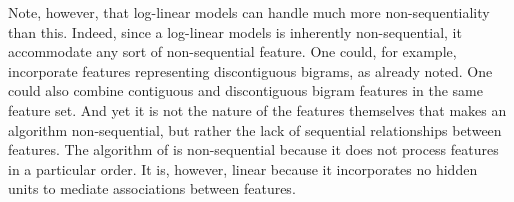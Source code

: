 Note, however, that log-linear models can handle much more non-sequentiality than this. Indeed, since a log-linear models is inherently non-sequential, it accommodate any sort of non-sequential feature. 
One could, for example, incorporate
features representing discontiguous bigrams,
as already noted.
 One could also combine contiguous and discontiguous bigram features in the same feature set.
And yet it is not the nature of the features themselves that makes an algorithm non-sequential, but rather the lack of sequential relationships between features. The algorithm of \cite{poon-et-al:2009} is non-sequential because it does not process features in a particular order.
It is, however, linear because it incorporates no hidden units to mediate associations between features.


